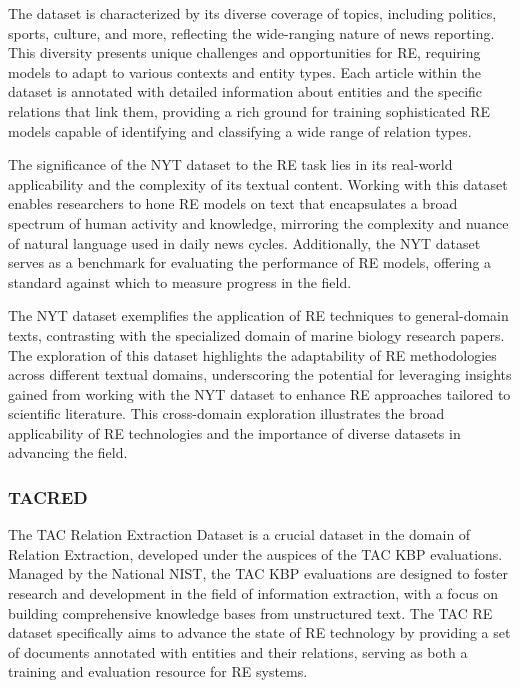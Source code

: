 The dataset is characterized by its diverse coverage of topics, including politics, sports, culture, and more, reflecting the wide-ranging nature of news reporting. This diversity presents unique challenges and opportunities for RE, requiring models to adapt to various contexts and entity types. Each article within the dataset is annotated with detailed information about entities and the specific relations that link them, providing a rich ground for training sophisticated RE models capable of identifying and classifying a wide range of relation types.

The significance of the NYT dataset to the RE task lies in its real-world applicability and the complexity of its textual content. Working with this dataset enables researchers to hone RE models on text that encapsulates a broad spectrum of human activity and knowledge, mirroring the complexity and nuance of natural language used in daily news cycles. Additionally, the NYT dataset serves as a benchmark for evaluating the performance of RE models, offering a standard against which to measure progress in the field.

The NYT dataset exemplifies the application of RE techniques to general-domain texts, contrasting with the specialized domain of marine biology research papers. The exploration of this dataset highlights the adaptability of RE methodologies across different textual domains, underscoring the potential for leveraging insights gained from working with the NYT dataset to enhance RE approaches tailored to scientific literature. This cross-domain exploration illustrates the broad applicability of RE technologies and the importance of diverse datasets in advancing the field.

\subsubsection{\ac{TACRED}}
\label{sec:tacreddataset}
The \ac{TAC} Relation Extraction Dataset is a crucial dataset in the domain of Relation Extraction, developed under the auspices of the TAC \ac{KBP} evaluations. Managed by the National \ac{NIST}, the TAC KBP evaluations are designed to foster research and development in the field of information extraction, with a focus on building comprehensive knowledge bases from unstructured text\cite{TAC}. The TAC RE dataset specifically aims to advance the state of RE technology by providing a set of documents annotated with entities and their relations, serving as both a training and evaluation resource for RE systems.

